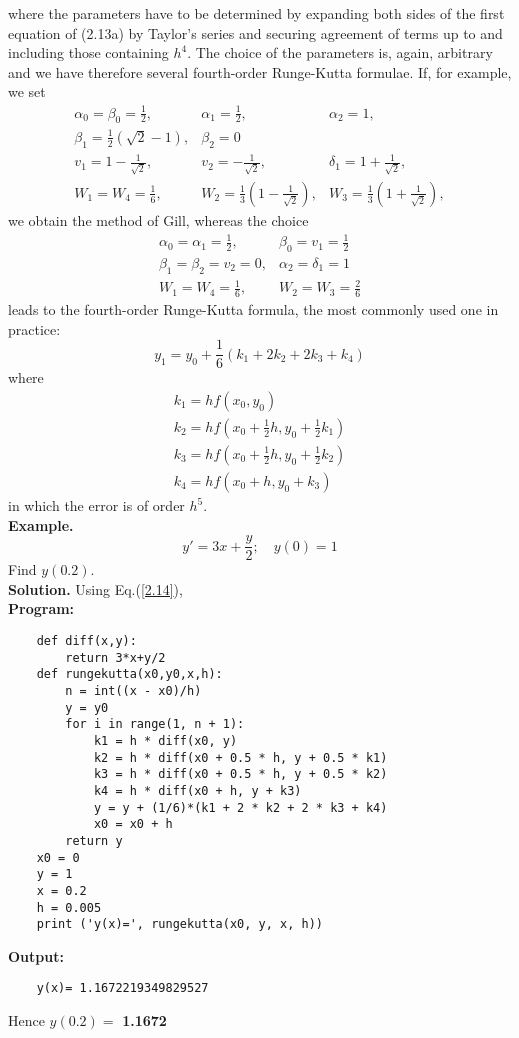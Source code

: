 \documentclass[12pt,a4paper,oneside]{book}
\begin{document}
where the parameters have to be determined by expanding both sides of the first equation of (2.13a) by Taylor's series and securing agreement of terms up to and including those containing $h^4$. The choice of the parameters is, again, arbitrary and we have therefore several fourth-order Runge-Kutta formulae. If, for example, we set
$$
\begin{array}{lll}
	\alpha_0=\beta_0=\frac{1}{2}, & \alpha_1=\frac{1}{2}, & \alpha_2=1, \\
	\beta_1=\frac{1}{2}(\sqrt{2}-1), & \beta_2=0 \\
	v_1=1-\frac{1}{\sqrt{2}}, & v_2=-\frac{1}{\sqrt{2}}, & \delta_1=1+\frac{1}{\sqrt{2}}, \\
	W_1=W_4=\frac{1}{6}, & W_2=\frac{1}{3}\left(1-\frac{1}{\sqrt{2}}\right), & W_3=\frac{1}{3}\left(1+\frac{1}{\sqrt{2}}\right),
\end{array}
$$
we obtain the method of Gill, whereas the choice
$$
\begin{array}{ll}
	\alpha_0=\alpha_1=\frac{1}{2}, & \beta_0=v_1=\frac{1}{2} \\
	\beta_1=\beta_2=v_2=0, & \alpha_2=\delta_1=1 \\
	W_1=W_4=\frac{1}{6}, & W_2=W_3=\frac{2}{6}
\end{array}
$$
leads to the fourth-order Runge-Kutta formula, the most commonly used one in practice:
\begin{equation}\label{2.14}
	y_1=y_0+\frac{1}{6}\left(k_1+2 k_2+2 k_3+k_4\right)
\end{equation}
where
$$
\begin{array}{l}
	k_1=h f\left(x_0, y_0\right) \\
	k_2=h f\left(x_0+\frac{1}{2} h, y_0+\frac{1}{2} k_1\right) \\
	k_3=h f\left(x_0+\frac{1}{2} h, y_0+\frac{1}{2} k_2\right) \\
	k_4=h f\left(x_0+h, y_0+k_3\right)
\end{array}
$$
in which the error is of order $h^5$.\\[0.5cm]

\noindent
\textbf{Example.}
$$y'=3x+\frac y2;\quad y(0)=1$$ Find $y(0.2)$.\\

\noindent\textbf{Solution.} Using Eq.(\ref{2.14}),\\
\noindent
\textbf{Program:}
\begin{lstlisting}
	def diff(x,y):
		return 3*x+y/2
	def rungekutta(x0,y0,x,h):
		n = int((x - x0)/h)
		y = y0
		for i in range(1, n + 1):
			k1 = h * diff(x0, y)
			k2 = h * diff(x0 + 0.5 * h, y + 0.5 * k1)
			k3 = h * diff(x0 + 0.5 * h, y + 0.5 * k2)
			k4 = h * diff(x0 + h, y + k3)
			y = y + (1/6)*(k1 + 2 * k2 + 2 * k3 + k4)
			x0 = x0 + h
		return y
	x0 = 0
	y = 1
	x = 0.2
	h = 0.005
	print ('y(x)=', rungekutta(x0, y, x, h))
\end{lstlisting}
\textbf{Output:}
\begin{verbatim}
	y(x)= 1.1672219349829527
\end{verbatim}
Hence $y(0.2)=$\textbf{ 1.1672}\\
\end{document}
